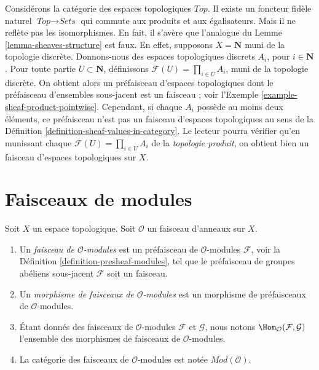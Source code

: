 \begin{example}
\label{example-sheaves-topological-spaces}
Considérons la catégorie des espaces topologiques $\textit{Top}$.
Il existe un foncteur fidèle naturel $\textit{Top} \to \textit{Sets}$
qui commute aux produits et aux égalisateurs. Mais il ne
reflète pas les isomorphismes. En fait, il s'avère que
l'analogue du Lemme \ref{lemma-sheaves-structure} est faux.
En effet, supposons $X = \mathbf{N}$ muni de la topologie
discrète. Donnons-nous des espaces topologiques discrets $A_i$, pour
$i \in \mathbf{N}$. Pour toute partie $U \subset \mathbf{N}$,
définissons $\mathcal{F}(U) = \prod_{i\in U} A_i$, muni de la
topologie discrète. On obtient alors un préfaisceau d'espaces
topologiques dont le préfaisceau d'ensembles sous-jacent est un faisceau ; voir
l'Exemple \ref{example-sheaf-product-pointwise}.
Cependant, si chaque $A_i$ possède au moins deux éléments, ce
préfaisceau n'est pas un faisceau d'espaces topologiques
au sens de la Définition \ref{definition-sheaf-values-in-category}.
Le lecteur pourra vérifier qu'en munissant chaque
$\mathcal{F}(U) = \prod_{i\in U} A_i$ de la {\it topologie produit}, on
obtient bien un faisceau
d'espaces topologiques sur $X$.
\end{example}


\section{Faisceaux de modules}
\label{section-sheaves-modules}

\begin{definition}
\label{definition-sheaf-modules}
Soit $X$ un espace topologique.
Soit $\mathcal{O}$ un faisceau d'anneaux sur $X$.
\begin{enumerate}
\item Un {\it faisceau de $\mathcal{O}$-modules} est un préfaisceau
de $\mathcal{O}$-modules $\mathcal{F}$,
voir la Définition \ref{definition-presheaf-modules},
tel que le préfaisceau de groupes abéliens sous-jacent $\mathcal{F}$
soit un faisceau.
\item Un {\it morphisme de faisceaux de $\mathcal{O}$-modules}
est un morphisme de préfaisceaux de $\mathcal{O}$-modules.
\item Étant donnés des faisceaux de $\mathcal{O}$-modules
$\mathcal{F}$ et $\mathcal{G}$, nous notons
$\Hom_\mathcal{O}(\mathcal{F}, \mathcal{G})$
l'ensemble des morphismes de faisceaux de $\mathcal{O}$-modules.
\item La catégorie des faisceaux de $\mathcal{O}$-modules
est notée $\textit{Mod}(\mathcal{O})$.
\end{enumerate}
\end{definition}

